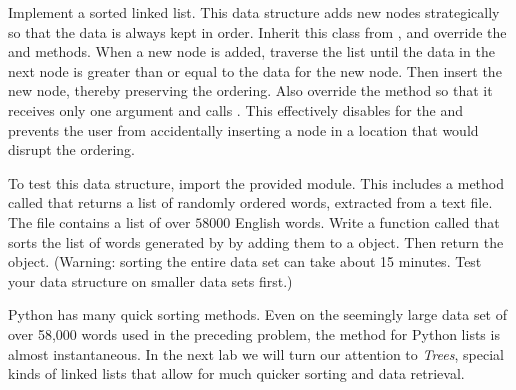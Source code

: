 \begin{problem}
Implement a sorted linked list.
This data structure adds new nodes strategically so that the data is always kept in order.
Inherit this class from , and override the  and  methods.
When a new node is added, traverse the list until the data in the next node is greater than or equal to the data for the new node.
Then insert the new node, thereby preserving the ordering.
Also override the  method so that it receives only one argument and calls .
This effectively disables  for the  and prevents the user from accidentally inserting a node in a location that would disrupt the ordering.

To test this data structure, import the provided  module.
This includes a method called  that returns a list of randomly ordered words, extracted from a text file.
The file  contains a list of over $58 000$ English words.
Write a function called  that sorts the list of words generated by  by adding them to a  object.
Then return the object.
(Warning: sorting the entire data set can take about 15 minutes. Test your data structure on smaller data sets first.)
\end{problem}

Python has many quick sorting methods.
Even on the seemingly large data set of over 58,000 words used in the preceding problem, the  method for Python lists is almost instantaneous.
In the next lab we will turn our attention to \emph{Trees}, special kinds of linked lists that allow for much quicker sorting and data retrieval.



